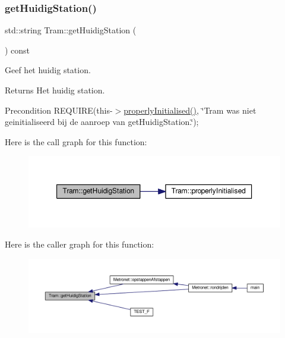 \subsubsection{\texorpdfstring{get\+Huidig\+Station()}{getHuidigStation()}}
{\footnotesize\ttfamily std\+::string Tram\+::get\+Huidig\+Station (\begin{DoxyParamCaption}{ }\end{DoxyParamCaption}) const}



Geef het huidig station. 

\begin{DoxyReturn}{Returns}
Het huidig station. 
\end{DoxyReturn}
\begin{DoxyPrecond}{Precondition}
R\+E\+Q\+U\+I\+RE(this-\/$>$\hyperlink{class_tram_ac2688f590e4db232b4f535c9bf959efb}{properly\+Initialised()}, \char`\"{}\+Tram was niet geinitialiseerd bij de aanroep van get\+Huidig\+Station.\char`\"{}); 
\end{DoxyPrecond}
Here is the call graph for this function\+:\nopagebreak
\begin{figure}[H]
\begin{center}
\leavevmode
\includegraphics[width=350pt]{class_tram_ae1d03c1fb6e0f5f97c57d35fe10fa8dd_cgraph}
\end{center}
\end{figure}
Here is the caller graph for this function\+:\nopagebreak
\begin{figure}[H]
\begin{center}
\leavevmode
\includegraphics[width=350pt]{class_tram_ae1d03c1fb6e0f5f97c57d35fe10fa8dd_icgraph}
\end{center}
\end{figure}
\mbox{\label{class_tram_a678ba2cd0c6ab76e966947944f599d56}} 
